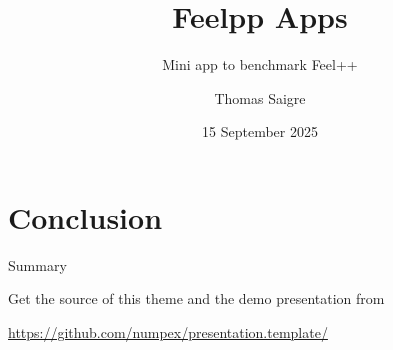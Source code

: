 \documentclass[aspectratio=169]{beamer}
\title{Feelpp Apps}
\subtitle{Mini app to benchmark Feel++}
\date{15 September 2025}
\author{Thomas Saigre}
\institute{Cemosis, Université de Strasbourg}
\begin{document}
\maketitle


\section{Conclusion}

\begin{frame}{Summary}

  Get the source of this theme and the demo presentation from

  \begin{center}\url{https://github.com/numpex/presentation.template/}\end{center}

\end{frame}

\end{document}
